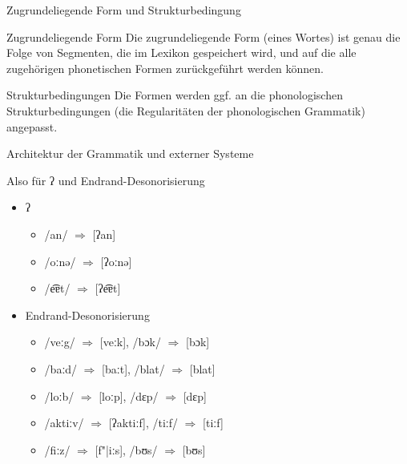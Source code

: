 \begin{frame}
  {Zugrundeliegende Form und Strukturbedingung}
  \pause
  \Large
  \begin{block}{Zugrundeliegende Form}    
    Die zugrundeliegende Form (eines Wortes) ist genau die Folge von Segmenten, die im Lexikon gespeichert wird, und auf die alle zugehörigen phonetischen Formen zurückgeführt werden können.
  \end{block}
  \pause
  \Zeile
  \begin{block}{Strukturbedingungen}
    Die Formen werden ggf. an die phonologischen Strukturbedingungen (die Regularitäten der phonologischen Grammatik) angepasst.    
  \end{block}
\end{frame}

\begin{frame}
  {Architektur der Grammatik und externer Systeme}
  \pause
  \centering
\end{frame}

\begin{frame}
  {Also für ʔ und Endrand-Desonorisierung}
  \pause
  \begin{itemize}[<+->]
    \item ʔ
      \begin{itemize}[<+->]
        \item /an/ $\Rightarrow$ [ʔan] 
        \item /oːnə/ $\Rightarrow$ [ʔoːnə]
        \item /e͡ɐt/ $\Rightarrow$ [ʔe͡ɐt]
      \end{itemize}
      \Zeile
    \item Endrand-Desonorisierung
      \begin{itemize}[<+->]
        \item /veːg/ $\Rightarrow$ [veːk], /bɔk/ $\Rightarrow$ [bɔk]
        \item /baːd/ $\Rightarrow$ [baːt], /blat/ $\Rightarrow$ [blat]
        \item /loːb/ $\Rightarrow$ [loːp], /dɛp/ $\Rightarrow$ [dɛp]
        \item /aktiːv/ $\Rightarrow$ [ʔaktiːf], /tiːf/ $\Rightarrow$ [tiːf]
        \item /fiːz/ $\Rightarrow$ [f"|iːs], /bʊs/ $\Rightarrow$ [bʊs]
      \end{itemize}
  \end{itemize}
\end{frame}


